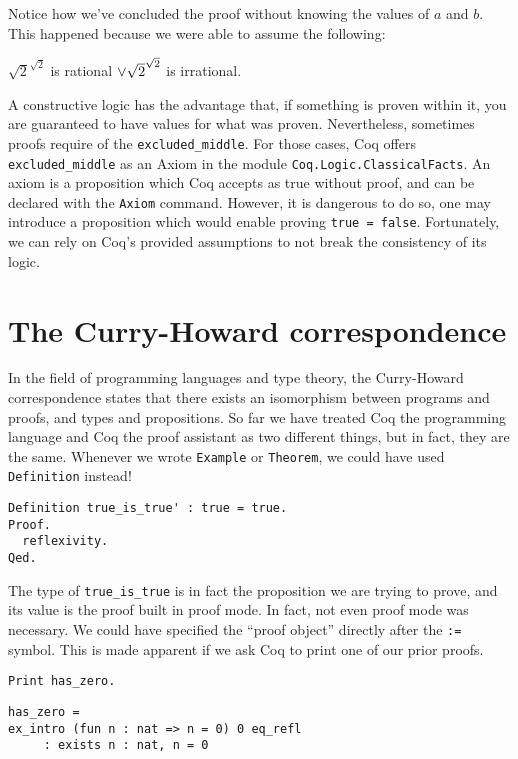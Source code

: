 Notice how we've concluded the proof without knowing the values of $a$ and $b$. This happened because we
were able to assume the following: 
\begin{center}
$\sqrt{2}^{\sqrt{2}}$ is rational ${\Large{\vee}} \sqrt{2}^{\sqrt{2}}$ is  irrational.
\end{center}
\noindent A constructive logic has the advantage that, if something is proven within it, you are 
guaranteed to have values for what was proven. Nevertheless, sometimes proofs require of the 
\texttt{excluded_middle}. For those cases, Coq offers \texttt{excluded_middle}
as an Axiom in the module \texttt{Coq.Logic.ClassicalFacts}. An axiom is a proposition
which Coq accepts as true without proof, and can be declared with the \texttt{Axiom}
command. However, it is dangerous to do so, one may introduce a proposition which would enable 
proving \texttt{true = false}. Fortunately, we can rely on Coq's provided assumptions to
not break the consistency of its logic.


\section{The Curry-Howard correspondence}
\label{sect:curry-howard}

In the field of programming languages and type theory, the Curry-Howard correspondence states that there
exists an isomorphism between programs and proofs, and types and propositions. So far we have treated Coq
the programming language and Coq the proof assistant as two different things, but in fact, they are the 
same. Whenever we wrote \texttt{Example} or \texttt{Theorem}, we could have used
\texttt{Definition} instead!

\begin{verbatim}
Definition true_is_true' : true = true.
Proof.
  reflexivity.
Qed.
\end{verbatim}

The type of \texttt{true_is_true} is in fact the proposition we are trying to prove, and its 
value is the proof built in proof mode. In fact, not even proof mode was necessary. We could have 
specified the ``proof object'' directly after the \texttt{:=} symbol. This is made apparent if we
ask Coq to print one of our prior proofs.

\begin{verbatim}
Print has_zero. 
\end{verbatim}
\vspace{-\baselineskip}
\begin{verbatim}
has_zero = 
ex_intro (fun n : nat => n = 0) 0 eq_refl
     : exists n : nat, n = 0
\end{verbatim}


